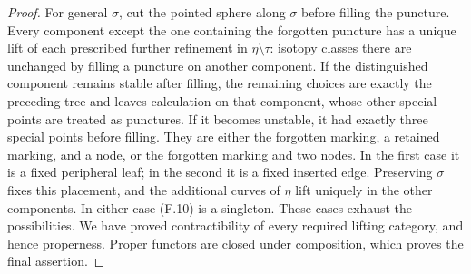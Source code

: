 \begin{proof}
For general $\sigma$, cut the pointed sphere along $\sigma$ before
filling the puncture.  Every component except the one containing the
forgotten puncture has a unique lift of each prescribed further
refinement in $\eta\setminus\tau$: isotopy classes there are unchanged
by filling a puncture on another component.  If the distinguished
component remains stable after filling, the remaining choices are
exactly the preceding tree-and-leaves calculation on that component,
whose other special points are treated as punctures.  If it becomes
unstable, it had exactly three special points before filling.  They
are either the forgotten marking, a retained marking, and a node, or
the forgotten marking and two nodes.  In the first case it is a fixed
peripheral leaf; in the second it is a fixed inserted edge.  Preserving
$\sigma$ fixes this placement, and the additional curves of $\eta$
lift uniquely in the other components.  In either case (F.10) is a
singleton.  These cases exhaust the possibilities.  We have proved
contractibility of every required lifting category, and hence
properness.  Proper functors are closed under composition, which proves
the final assertion.
\end{proof}

